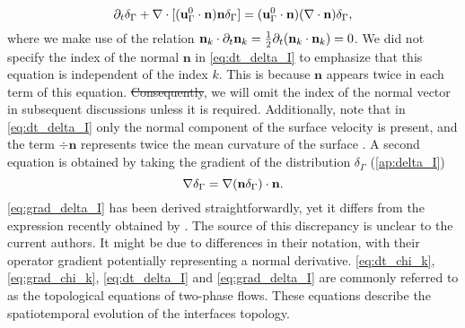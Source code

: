 \documentclass[11pt]{My_preprint}
\providecommand{\DIFadd}[1]{{\protect\color{blue}\uwave{#1}}} %
\providecommand{\DIFdel}[1]{{\protect\color{red}\sout{#1}}}                      %
\providecommand{\DIFaddbegin}{} %
\providecommand{\DIFaddend}{} %
\providecommand{\DIFdelbegin}{} %
\providecommand{\DIFdelend}{} %
\begin{document}
\begin{equation}
    \pddt \delta_\Gamma
    + \div [(\textbf{u}_\Gamma^0\cdot \textbf{n}) \textbf{n}\delta_\Gamma ]
    = (\textbf{u}_\Gamma^0 \cdot \textbf{n})(\div\textbf{n}) \delta_\Gamma ,
    \label{eq:dt_delta_I}
\end{equation} 
where we make use of the relation $\textbf{n}_k\cdot \partial_t\textbf{n}_k= \frac{1}{2}\partial_t(\textbf{n}_k\cdot \textbf{n}_k) = 0$. 
We did not specify the index of the normal $\textbf{n}$ in \ref{eq:dt_delta_I} to emphasize that this equation is independent of the index $k$. This is because $\textbf{n}$ appears twice in each term of this equation. 
\DIFdelbegin \DIFdel{Consequently}\DIFdelend \DIFaddbegin \DIFadd{Likewise}\DIFaddend , we will omit the index of the normal vector in subsequent discussions unless it is required. Additionally, note that in \ref{eq:dt_delta_I} only the normal component of the surface velocity is present, and the term $\div \textbf{n}$ represents twice the mean curvature of the surface \citep{aris2012vectors}.  A second equation is obtained by taking the gradient of the distribution $\delta_\Gamma $ (\ref{ap:delta_I})\DIFaddbegin \DIFadd{, namely, 
}\DIFaddend \begin{equation}
    \grad\delta_\Gamma  
    =   \grad (\textbf{n} \delta_\Gamma) \cdot \textbf{n}.
    \label{eq:grad_delta_I}
\end{equation}
\ref{eq:grad_delta_I} has been derived straightforwardly, yet it differs from the expression recently obtained by \citet{orlando2023evolution}.  The source of this discrepancy is unclear to the current authors. 
It might be due to differences in their notation, with their operator gradient potentially representing a normal derivative. 
\ref{eq:dt_chi_k}, \ref{eq:grad_chi_k}, \ref{eq:dt_delta_I} and \ref{eq:grad_delta_I}  are commonly referred to as the topological equations of two-phase flows.
These equations describe the spatiotemporal evolution of the interfaces topology.
\end{document}
